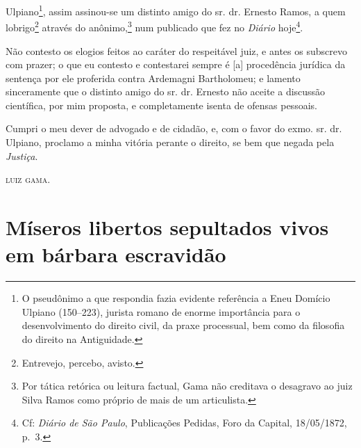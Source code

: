 {\begin{flushright}
Ulpiano\footnote{ O pseudônimo a que respondia fazia evidente
  referência a Eneu Domício Ulpiano (150--223), jurista romano de enorme
  importância para o desenvolvimento do direito civil, da praxe
  processual, bem como da filosofia do direito na Antiguidade.}, assim
assinou-se um distinto amigo do sr. dr. Ernesto Ramos, a quem
lobrigo\footnote{ Entrevejo, percebo, avisto.} através do
anônimo,\footnote{ Por tática retórica ou leitura factual, Gama não
  creditava o desagravo ao juiz Silva Ramos como próprio de mais de um
  articulista.} num publicado que fez no \emph{Diário} hoje\footnote{
  Cf: \emph{Diário de São Paulo}, Publicações Pedidas, Foro da Capital,
  18/05/1872, p.~3.}.

Não contesto os elogios feitos ao caráter do respeitável juiz, e antes
os subscrevo com prazer; o que eu contesto e contestarei sempre é
{[}a{]} procedência jurídica da sentença por ele proferida contra
Ardemagni Bartholomeu; e lamento sinceramente que o distinto amigo do
sr. dr. Ernesto não aceite a discussão científica, por mim proposta, e
completamente isenta de ofensas pessoais.

Cumpri o meu dever de advogado e de cidadão, e, com o favor do exmo. sr.
dr. Ulpiano, proclamo a minha vitória perante o direito, se bem que
negada pela \emph{Justiça}.

\textsc{luiz gama}.

\part{Míseros libertos sepultados vivos em bárbara escravidão}


\end{flushright}}
